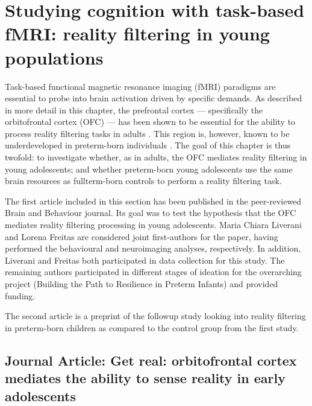 \chapter{Studying cognition with task-based fMRI: reality filtering in young populations}\label{chapter:ch4}


\vspace{2cm}

Task-based functional magnetic resonance imaging (fMRI) paradigms are essential to probe into brain activation driven by specific demands. As described in more detail in this chapter, the prefrontal cortex --- specifically the orbitofrontal cortex (OFC) --- has been shown to be essential for the ability to process reality filtering tasks in adults \citep{Schnider2018}. This region is, however, known to be underdeveloped in preterm-born individuals \citep{Thompson2007}. The goal of this chapter is thus twofold: to investigate whether, as in adults, the OFC mediates reality filtering in young adolescents; and whether preterm-born young adolescents use the same brain resources as fullterm-born controls to perform a reality filtering task.  


The first article included in this section has been published in the peer-reviewed Brain and Behaviour journal. Its goal was to test the hypothesis that the OFC mediates reality filtering processing in young adolescents. Maria Chiara Liverani and Lorena Freitas are considered joint first-authors for the paper, having performed the behavioural and neuroimaging analyses, respectively. In addition, Liverani and Freitas both participated in data collection for this study. The remaining authors participated in different stages of ideation for the overarching project (Building the Path to Resilience in Preterm Infants) and provided funding. 

The second article is a preprint of the followup study looking into reality filtering in preterm-born children as compared to the control group from the first study. 

\clearpage

\section{Journal Article:  Get real: orbitofrontal cortex mediates the ability to sense reality in early adolescents} \label{section:ch4_orfi_ctrl}

